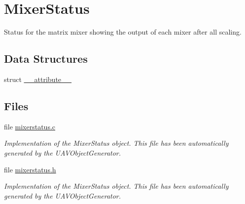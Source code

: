 \hypertarget{group___mixer_status}{\section{\-Mixer\-Status}
\label{group___mixer_status}
}


\-Status for the matrix mixer showing the output of each mixer after all scaling.  


\subsection*{\-Data \-Structures}
\begin{DoxyCompactItemize}
\item 
struct \hyperlink{struct____attribute____}{\-\_\-\-\_\-attribute\-\_\-\-\_\-}
\end{DoxyCompactItemize}
\subsection*{\-Files}
\begin{DoxyCompactItemize}
\item 
file \hyperlink{mixerstatus_8c}{mixerstatus.\-c}
\begin{DoxyCompactList}\small\item\em \-Implementation of the \-Mixer\-Status object. \-This file has been automatically generated by the \-U\-A\-V\-Object\-Generator. \end{DoxyCompactList}\item 
file \hyperlink{mixerstatus_8h}{mixerstatus.\-h}
\begin{DoxyCompactList}\small\item\em \-Implementation of the \-Mixer\-Status object. \-This file has been automatically generated by the \-U\-A\-V\-Object\-Generator. \end{DoxyCompactList}\end{DoxyCompactItemize}
